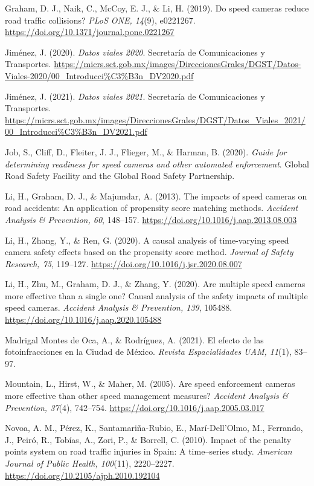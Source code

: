 \begin{thebibliography}{}
Graham, D. J., Naik, C., McCoy, E. J., \& Li, H. (2019). Do speed cameras reduce road traffic collisions? \textit{PLoS ONE, 14}(9), e0221267. \url{https://doi.org/10.1371/journal.pone.0221267}

Jiménez, J. (2020). \textit{Datos viales 2020}. Secretaría de Comunicaciones y Transportes. \url{https://micrs.sct.gob.mx/images/DireccionesGrales/DGST/Datos-Viales-2020/00_Introducci%C3%B3n_DV2020.pdf}

Jiménez, J. (2021). \textit{Datos viales 2021}. Secretaría de Comunicaciones y Transportes. \url{https://micrs.sct.gob.mx/images/DireccionesGrales/DGST/Datos_Viales_2021/00_Introducci%C3%B3n_DV2021.pdf}

Job, S., Cliff, D., Fleiter, J. J., Flieger, M., \& Harman, B. (2020). \textit{Guide for determining readiness for speed cameras and other automated enforcement}. Global Road Safety Facility and the Global Road Safety Partnership.

Li, H., Graham, D. J., \& Majumdar, A. (2013). The impacts of speed cameras on road accidents: An application of propensity score matching methods. \textit{Accident Analysis \& Prevention, 60}, 148–157. \url{https://doi.org/10.1016/j.aap.2013.08.003}

Li, H., Zhang, Y., \& Ren, G. (2020). A causal analysis of time-varying speed camera safety effects based on the propensity score method. \textit{Journal of Safety Research, 75}, 119–127. \url{https://doi.org/10.1016/j.jsr.2020.08.007}

Li, H., Zhu, M., Graham, D. J., \& Zhang, Y. (2020). Are multiple speed cameras more effective than a single one? Causal analysis of the safety impacts of multiple speed cameras. \textit{Accident Analysis \& Prevention, 139}, 105488. \url{https://doi.org/10.1016/j.aap.2020.105488}

Madrigal Montes de Oca, A., \& Rodríguez, A. (2021). El efecto de las fotoinfracciones en la Ciudad de México. \textit{Revista Espacialidades UAM, 11}(1), 83–97.

Mountain, L., Hirst, W., \& Maher, M. (2005). Are speed enforcement cameras more effective than other speed management measures? \textit{Accident Analysis \& Prevention, 37}(4), 742–754. \url{https://doi.org/10.1016/j.aap.2005.03.017}

Novoa, A. M., Pérez, K., Santamariña-Rubio, E., Marí-Dell’Olmo, M., Ferrando, J., Peiró, R., Tobías, A., Zori, P., \& Borrell, C. (2010). Impact of the penalty points system on road traffic injuries in Spain: A time–series study. \textit{American Journal of Public Health, 100}(11), 2220–2227. \url{https://doi.org/10.2105/ajph.2010.192104}


\end{thebibliography}
